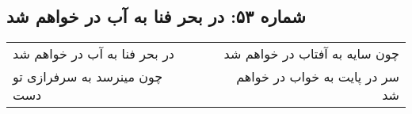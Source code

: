 \begin{center}
\section*{شماره ۵۳: در بحر فنا به آب در خواهم شد}
\label{sec:053}
\begin{longtable}{l p{0.5cm} r}
در بحر فنا به آب در خواهم شد
&&
چون سایه به آفتاب در خواهم شد
\\
چون مینرسد به سرفرازی تو دست
&&
سر در پایت به خواب در خواهم شد
\\
\end{longtable}
\end{center}
